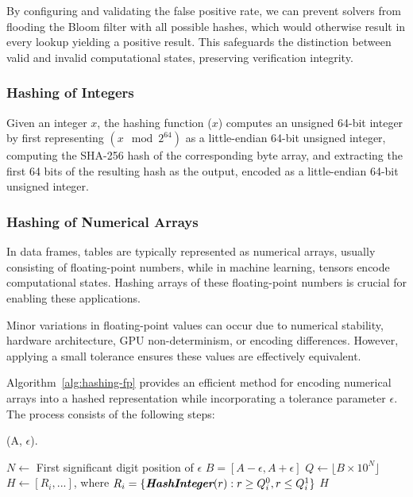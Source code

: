 \documentclass[sigconf, nonacm]{acmart}
\begin{document}
By configuring and validating the false positive rate, we can prevent  solvers from flooding the Bloom filter with all possible hashes, which would otherwise result in every lookup yielding a positive result. This safeguards the distinction between valid and invalid computational states, preserving verification integrity.

\subsubsection{Hashing of Integers}
\label{sec:int_fp}

Given an integer $x$, the hashing function ($x$) computes an unsigned 64-bit integer by first representing $(x \mod 2^{64})$ as a little-endian 64-bit unsigned integer, computing the SHA-256 hash of the corresponding byte array, and extracting the first 64 bits of the resulting hash as the output, encoded as a little-endian 64-bit unsigned integer.

\subsubsection{Hashing of Numerical Arrays}
\label{sec:hashing_fp}

In data frames, tables are typically represented as numerical arrays, usually consisting of floating-point numbers, while in machine learning, tensors encode computational states. Hashing arrays of these floating-point numbers is crucial for enabling these applications.

Minor variations in floating-point values can occur due to numerical stability, hardware architecture, GPU non-determinism, or encoding differences. However, applying a small tolerance ensures these values are effectively equivalent.

Algorithm~\ref{alg:hashing-fp} provides an efficient method for encoding numerical arrays into a hashed representation while incorporating a tolerance parameter $\epsilon$.
The process consists of the following steps:

\begin{algorithm}
  \caption{(A, $\epsilon$).}
  \label{alg:hashing-fp}
  \begin{algorithmic}[1]
    \STATE $N \leftarrow$ First significant digit position of $\epsilon$
    \STATE $B = [A - \epsilon,  A + \epsilon]$
    \STATE $Q \leftarrow \lfloor B \times 10^N \rfloor$
    \STATE $H \leftarrow [R_i, ...]$, where $R_i = \{ \textit{\textbf{HashInteger}}(r) : r \geq Q_i^0, r \leq Q_i^1\}$
    \RETURN $H$
  \end{algorithmic}
\end{algorithm}
\end{document}

